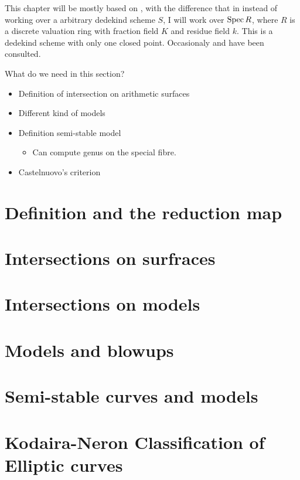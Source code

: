 This chapter will be mostly based on \cite[chap.\ 8, 9, 10]{liuAlgebraicGeometryArithmetic2002}, with the difference that in instead of working over a arbitrary dedekind scheme $S$, I will work over $\operatorname{Spec} R$, where $R$ is a discrete valuation ring with fraction field $K$ and residue field $k$. This is a dedekind scheme with only one closed point.  
Occasionaly \cite[appendix A]{hartshorneAlgebraicGeometry1977} and \cite[sec.\ III.7-8]{silvermanAdvancedTopicsArithmetic1994} have been consulted. 


What do we need in this section? 
\begin{itemize}
	\item Definition of intersection on arithmetic surfaces
	\item Different kind of models
	\item Definition semi-stable model
		\begin{itemize}
			\item Can compute genus on the special fibre. 
		\end{itemize}
	\item Castelnuovo's criterion
\end{itemize}

\section{Definition and the reduction map} \label{sec:models}


\section{Intersections on surfraces} \label{sec:intersections_on_surfraces}


\section{Intersections on models} \label{sec:intersections_on_models}


\section{Models and blowups} \label{sec:models_and_blowups}


\section{Semi-stable curves and models} \label{sec:semi-stable_curves_and_models}



\section{Kodaira-Neron Classification of Elliptic curves} \label{sec:kodaira-neron_classification_of_elliptic_curves}


